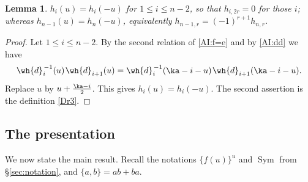 \documentclass{amsart}
\newtheorem{lemma}[theorem]{Lemma}
\numberwithin{equation}{section}
\theoremstyle{remark}
\DeclareMathOperator{\Sym}{Sym}
\renewcommand{\,}{\kern 0.1em} %
\begin{document}
\begin{lemma} \label{L:heven}
%
$h_i(u) = h_i(-u)$ for $1\le i\le n-2$, so that $h_{i,2r}=0$ for those $i$; whereas
$h_{n-1}(u) = h_n(-u)$, equivalently $h_{n-1,r} = (-1)^{r+1}h_{n,r}$.
%
\end{lemma}

\begin{proof}
%
Let $1\le i\le n-2$. By the second relation of \eqref{AI:f=e} and by \eqref{AI:dd} we have
%
\[
\wh{d}^{\,-1}_i(u)\,\wh{d}_{i+1}(u) = \wh{d}^{\,-1}_i(\ka-i-u)\,\wh{d}_{i+1}(\ka-i-u) .
\]
%
Replace $u$ by $u+\frac{\ka-i}{2}$. This gives $h_i(u)=h_i(-u)$. The second assertion is the
definition \eqref{Dr3}.
%
\end{proof}


\subsection{The presentation} \label{sec:presentation}

We now state the main result. Recall the notations $\{f(u)\}^u$ and $\Sym$ from
\S\ref{sec:notation}, and $\{a,b\}=ab+ba$.
\end{document}
